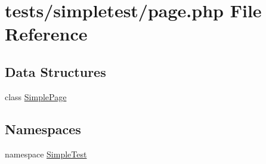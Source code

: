 \hypertarget{page_8php}{\section{tests/simpletest/page.php File Reference}
\label{page_8php}
}
\subsection*{Data Structures}
\begin{DoxyCompactItemize}
\item 
class \hyperlink{class_simple_page}{Simple\-Page}
\end{DoxyCompactItemize}
\subsection*{Namespaces}
\begin{DoxyCompactItemize}
\item 
namespace \hyperlink{namespace_simple_test}{Simple\-Test}
\end{DoxyCompactItemize}
